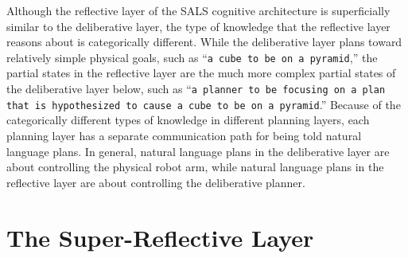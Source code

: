 Although the reflective layer of the SALS cognitive architecture is
superficially similar to the deliberative layer, the type of knowledge
that the reflective layer reasons about is categorically different.
While the deliberative layer plans toward relatively simple physical
goals, such as ``{\tt{a cube to be on a pyramid}},'' the partial
states in the reflective layer are the much more complex partial
states of the deliberative layer below, such as ``{\tt{a planner to be
    focusing on a plan that is hypothesized to cause a cube to be on a
    pyramid}}.''  Because of the categorically different types of
knowledge in different planning layers, each planning layer has a
separate communication path for being told natural language plans.  In
general, natural language plans in the deliberative layer are about
controlling the physical robot arm, while natural language plans in
the reflective layer are about controlling the deliberative planner.

\section{The Super-Reflective Layer}
\label{section:the_super_reflective_layer}

